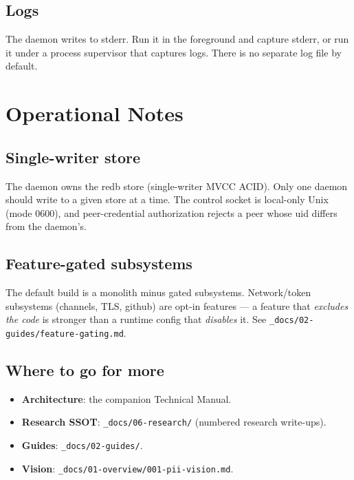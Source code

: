 \documentclass[
	fontsize=10pt,
	twoside=false,
	secnumdepth=2,
	open=any,
]{kaobook}
\begin{document}
\section{Logs}

The daemon writes to stderr. Run it in the foreground and capture stderr,
or run it under a process supervisor that captures logs. There is no
separate log file by default.

\chapter{Operational Notes}
\label{chap:ops}

\section{Single-writer store}

The daemon owns the redb store (single-writer MVCC ACID). Only one daemon
should write to a given store at a time. The control socket is local-only
Unix (mode 0600), and peer-credential authorization rejects a peer whose
uid differs from the daemon's.

\section{Feature-gated subsystems}

The default build is a monolith minus gated subsystems. Network/token
subsystems (channels, TLS, github) are opt-in features — a feature that
\emph{excludes the code} is stronger than a runtime config that
\emph{disables} it. See \texttt{\_docs/02-guides/feature-gating.md}.

\section{Where to go for more}

\begin{itemize}
    \item \textbf{Architecture}: the companion Technical Manual.
    \item \textbf{Research SSOT}: \texttt{\_docs/06-research/} (numbered
        research write-ups).
    \item \textbf{Guides}: \texttt{\_docs/02-guides/}.
    \item \textbf{Vision}: \texttt{\_docs/01-overview/001-pii-vision.md}.
\end{itemize}

\backmatter
{}

\printindex
\end{document}
